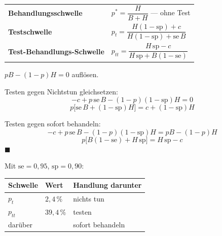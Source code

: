 \begin{merksatz}
\begin{center}
{\small
\renewcommand{\arraystretch}{1.6}
\begin{tabular}{@{}P{3.8cm}P{4.8cm}@{}}
\toprule
\textbf{Behandlungs\-schwelle} & $p^{*} = \dfrac{H}{B+H}$ --- ohne Test\\
\textbf{Testschwelle} & $p_t = \dfrac{H(1-\text{sp}) + c}{H(1-\text{sp}) + \text{se}\,B}$\\
\textbf{Test-Behand\-lungs-Schwelle} & $p_{tt} = \dfrac{H\,\text{sp} - c}{H\,\text{sp} + B(1-\text{se})}$\\
\bottomrule
\end{tabular}}
\end{center}

 $pB - (1-p)H = 0$ auflösen.

 Testen gegen Nichtstun gleichsetzen:
\[ -c + p\,\text{se}\,B - (1-p)(1-\text{sp})H = 0 \]
\[ p\bigl[\text{se}\,B + (1-\text{sp})H\bigr] = c + (1-\text{sp})H \]

 Testen gegen sofort behandeln:
\[ -c + p\,\text{se}\,B - (1-p)(1-\text{sp})H = pB - (1-p)H \]
\[ p\bigl[B(1-\text{se}) + H\,\text{sp}\bigr] = H\,\text{sp} - c \]
$\blacksquare$

Mit $\text{se} = 0{,}95$, $\text{sp} = 0{,}90$:
\begin{center}
{\small
\renewcommand{\arraystretch}{1.5}
\begin{tabular}{@{}P{3.4cm}P{2.2cm}P{2.4cm}@{}}
\toprule
\textbf{Schwelle} & \textbf{Wert} & \textbf{Handlung darunter}\\
\midrule
$p_t$ & $2{,}4\,\%$ & nichts tun\\
$p_{tt}$ & $39{,}4\,\%$ & testen\\
darüber & & sofort behandeln\\
\bottomrule
\end{tabular}}
\end{center}

\begin{center}
\end{center}


\end{merksatz}
